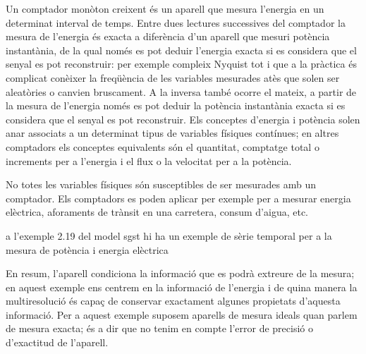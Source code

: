   Un comptador monòton creixent és un aparell que mesura l'energia en
  un determinat interval de temps. Entre dues lectures successives del
  comptador la mesura de l'energia és exacta a diferència d'un aparell
  que mesuri potència instantània, de la qual només es pot deduir
  l'energia exacta si es considera que el senyal es pot reconstruir:
  per exemple compleix Nyquist tot i que a la pràctica és
  complicat conèixer la freqüència de les variables mesurades atès que
  solen ser aleatòries o canvien bruscament. A la inversa també ocorre
  el mateix, a partir de la mesura de l'energia només es pot deduir la
  potència instantània exacta si es considera que el senyal es pot
  reconstruir.  Els conceptes d'energia i potència solen anar
  associats a un determinat tipus de variables físiques contínues; en
  altres comptadors els conceptes equivalents són el quantitat,
  comptatge total o increments per a l'energia i el flux o la
  velocitat per a la potència.



  No totes les variables físiques són susceptibles de ser mesurades
  amb un comptador. Els comptadors es poden aplicar per exemple per a
  mesurar energia elèctrica, aforaments de trànsit en una carretera, consum
  d'aigua, etc.
  
   a l'exemple 2.19 %
 del model sgst hi ha un exemple de sèrie temporal per a la mesura de potència i energia elèctrica 


  En resum, l'aparell condiciona la informació que es podrà extreure
  de la mesura; en aquest exemple ens centrem en la informació de
  l'energia i de quina manera la multiresolució és capaç de conservar
  exactament algunes propietats d'aquesta informació.  Per a aquest
  exemple suposem aparells de mesura ideals quan parlem de mesura
  exacta; és a dir que no tenim en compte l'error de precisió o
  d'exactitud de l'aparell.

 



